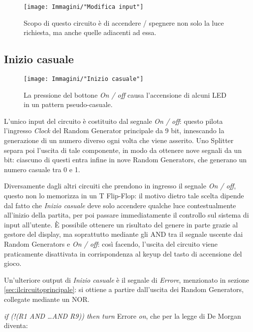 \documentclass[11pt]{article}
\begin{document}
\begin{figure}[H]
\centering
\texttt{[image: Immagini/"Modifica input"]}
\caption{{\small Scopo di questo circuito è di accendere / spegnere non solo la luce richiesta, ma anche quelle adiacenti ad essa.}}
\label{fig:modificainput}
\end{figure}
\pagebreak


\subsection{Inizio casuale}
\label{sec:iniziocasuale}

\begin{figure}[!h]
\centering
\texttt{[image: Immagini/"Inizio casuale"]}
\caption{{\small La pressione del bottone {\itshape On / off} causa l'accensione di alcuni LED in un pattern pseudo-casuale.}}
\label{fig:iniziocasuale}
\end{figure}

L'unico input del circuito è costituito dal segnale {\itshape On / off}: questo pilota l'ingresso {\itshape Clock} del Random Generator principale da 9 bit, innescando la generazione di un numero diverso ogni volta che viene asserito. Uno Splitter separa poi l'uscita di tale componente, in modo da ottenere nove segnali da un bit: ciascuno di questi entra infine in nove Random Generators, che generano un numero casuale tra 0 e 1.

Diversamente dagli altri circuiti che prendono in ingresso il segnale {\itshape On / off}, questo non lo memorizza in un T Flip-Flop: il motivo dietro tale scelta dipende dal fatto che {\itshape Inizio casuale} deve solo accendere qualche luce contestualmente all'inizio della partita, per poi passare immediatamente il controllo sul sistema di input all'utente. È possibile ottenere un risultato del genere in parte grazie al gestore del display, ma soprattutto mediante gli AND tra il segnale uscente dai Random Generators e {\itshape On / off}: così facendo, l'uscita del circuito viene praticamente disattivata in corrispondenza al keyup del tasto di accensione del gioco.

Un'ulteriore output di {\itshape Inizio casuale} è il segnale di {\itshape Errore}, menzionato in sezione \underline{\vref{sec:ilcircuitoprincipale}}: si ottiene a partire dall'uscita dei Random Generators, collegate mediante un NOR.

{\itshape if (!(R1 AND \dots AND R9)) then turn} Errore {\itshape on}, che per la legge di De Morgan diventa:
\end{document}
